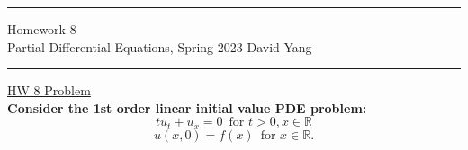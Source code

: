 \documentclass[11pt]{article}
\begin{document}
	\hrule
	\begin{center}
		{\Large Homework 8} \\ %
		\vspace{0.2cm}
		Partial Differential Equations, Spring 2023 \hfill David Yang %
	\end{center}

\hrule

\vspace{1em}


\underline{HW 8 Problem} \\

\textbf{Consider the 1st order linear initial value PDE problem:
\[tu_t + u_x = 0 \, \, \, \text{for } t > 0, x \in \mathbb{R}\]
\[ u(x, 0) = f(x) \, \, \, \text{for } x \in \mathbb{R}.\]}
\end{document}

